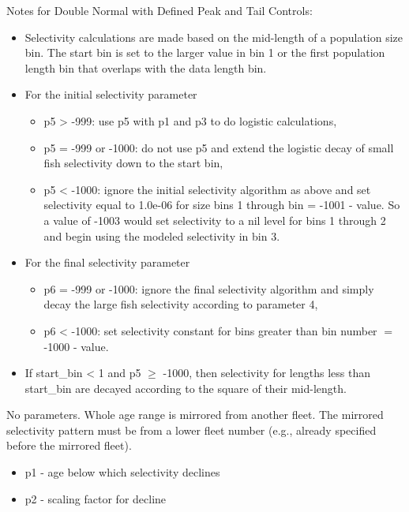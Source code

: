 Notes for Double Normal with Defined Peak and Tail Controls:
	\begin{itemize}
		\item Selectivity calculations are made based on the mid-length of a population size bin. The start bin is set to the larger value in bin 1 or the first population length bin that overlaps with the data length bin.
		\item For the initial selectivity parameter
		\begin{itemize}
			\item p5 > -999: use p5 with p1 and p3 to do logistic calculations,
			\item p5 = -999 or -1000: do not use p5 and extend the logistic decay of small fish selectivity down to the start bin,
			\item p5 < -1000: ignore the initial selectivity algorithm as above and set selectivity equal to 1.0e-06 for size bins 1 through bin = -1001 - value. So a value of -1003 would set selectivity to a nil level for bins 1 through 2 and begin using the modeled selectivity in bin 3.
		\end{itemize}
		\item For the final selectivity parameter
		\begin{itemize}
			\item p6 = -999 or -1000: ignore the final selectivity algorithm and simply decay the large fish selectivity according to parameter 4,
			\item p6 < -1000: set selectivity constant for bins greater than bin number $=$ -1000 - value.
		\end{itemize}
		\item If start\_bin < 1 and p5 $\geq$ -1000, then selectivity for lengths less than start\_bin are decayed according to the square of their mid-length.
	\end{itemize}

\hypertarget{MirrorAnotherSelectivity}{}
No parameters. Whole age range is mirrored from another fleet. The mirrored selectivity pattern must be from a lower fleet number (e.g., already specified before the mirrored fleet).

\hypertarget{GaussianSelectivity}{}
	\begin{itemize}
		\item p1 - age below which selectivity declines
		\item p2 - scaling factor for decline
	\end{itemize}

